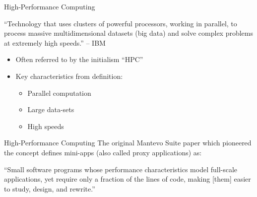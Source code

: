 \documentclass[10pt,aspectratio=169]{beamer}
\begin{document}
\begin{frame}{High-Performance Computing}
    \begin{displayquote}
        \vspace{0.2cm}
        ``Technology that uses clusters of powerful processors, working in parallel, to process massive multidimensional datasets (big data) and solve complex problems at extremely high speeds.'' -- IBM \cite{WhatHPCIntroduction}
    \end{displayquote}
    \vspace*{0.5cm}
    \begin{itemize}
        \item Often referred to by the initialism ``HPC''
        \item Key characteristics from definition:
        \begin{itemize}
            \item Parallel computation
            \item Large data-sets
            \item \alert{High speeds}
        \end{itemize}
    \end{itemize}
\end{frame}

\begin{frame}{High-Performance Computing}
    The original Mantevo Suite paper \cite{heroux2013mantevo} which pioneered the concept defines mini-apps (also called proxy applications) as:  %
    \begin{displayquote}
        \vspace{0.2cm}
        ``Small software programs whose performance characteristics model full-scale applications, yet require only a fraction of the lines of code, making [them] easier to study, design, and rewrite.''
    \end{displayquote}
\end{frame}
\end{document}
